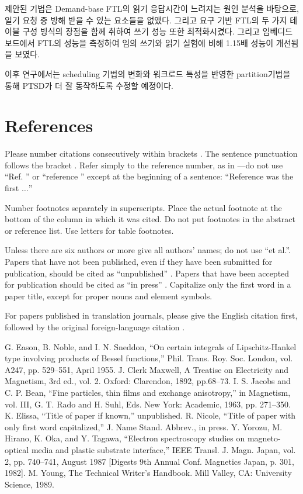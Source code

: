 \documentclass[conference]{IEEEtran}
\begin{document}
제안된 기법은 Demand-base FTL의 읽기 응답시간이 느려지는 원인 분석을 바탕으로, 일기 요청 중 방해 
받을 수 있는 요소들을 없앴다. 그리고 요구 기반 FTL의 두 가지 테이블 구성 빙식의 장점을 함께 취하여
쓰기 성능 또한 최적화시켰다. 그리고 임베디드 보드에서 FTL의 성능을 측정하여 임의 쓰기와 읽기 
실험에 비해 1.15배 성능이 개선됨을 보였다.\par

이후 연구에서는 scheduling 기법의 변화와 워크로드 특성을 반영한 partition기법을 통해 PTSD가 더 
잘 동작하도록 수정할 예정이다.

\section*{References}

Please number citations consecutively within brackets \cite{b1}. The 
sentence punctuation follows the bracket \cite{b2}. Refer simply to the reference 
number, as in \cite{b3}---do not use ``Ref. \cite{b3}'' or ``reference \cite{b3}'' except at 
the beginning of a sentence: ``Reference \cite{b3} was the first $\ldots$''

Number footnotes separately in superscripts. Place the actual footnote at 
the bottom of the column in which it was cited. Do not put footnotes in the 
abstract or reference list. Use letters for table footnotes.

Unless there are six authors or more give all authors' names; do not use 
``et al.''. Papers that have not been published, even if they have been 
submitted for publication, should be cited as ``unpublished'' \cite{b4}. Papers 
that have been accepted for publication should be cited as ``in press'' \cite{b5}. 
Capitalize only the first word in a paper title, except for proper nouns and 
element symbols.

For papers published in translation journals, please give the English 
citation first, followed by the original foreign-language citation \cite{b6}.

\begin{thebibliography}{00}
 G. Eason, B. Noble, and I. N. Sneddon, ``On certain integrals of Lipschitz-Hankel type involving products of Bessel functions,'' Phil. Trans. Roy. Soc. London, vol. A247, pp. 529--551, April 1955.
 J. Clerk Maxwell, A Treatise on Electricity and Magnetism, 3rd ed., vol. 2. Oxford: Clarendon, 1892, pp.68--73.
 I. S. Jacobs and C. P. Bean, ``Fine particles, thin films and exchange anisotropy,'' in Magnetism, vol. III, G. T. Rado and H. Suhl, Eds. New York: Academic, 1963, pp. 271--350.
 K. Elissa, ``Title of paper if known,'' unpublished.
 R. Nicole, ``Title of paper with only first word capitalized,'' J. Name Stand. Abbrev., in press.
 Y. Yorozu, M. Hirano, K. Oka, and Y. Tagawa, ``Electron spectroscopy studies on magneto-optical media and plastic substrate interface,'' IEEE Transl. J. Magn. Japan, vol. 2, pp. 740--741, August 1987 [Digests 9th Annual Conf. Magnetics Japan, p. 301, 1982].
 M. Young, The Technical Writer's Handbook. Mill Valley, CA: University Science, 1989.
\end{thebibliography}
\end{document}
